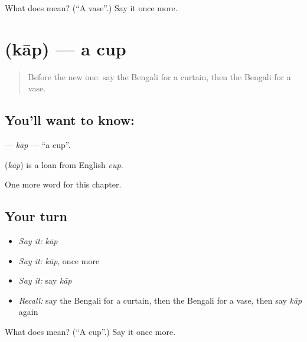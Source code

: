 \begin{tcolorbox}[breakable,colback=teal!4,colframe=teal!35!black,title={Before you move on}]
What does  mean? (\textquotedblleft{}A vase\textquotedblright{}.) Say it once more.
\end{tcolorbox}
\section[\texorpdfstring{\bn{কাপ} (kāp)}{কাপ (kāp)}]{ (kāp) — a cup}

\label{lesson:BN-C133-kap}



\begin{quote}
Before the new one: say the Bengali for a curtain, then the Bengali for a vase.
\end{quote}

\subsection*{You'll want to know: }
\textbf{} — \emph{kāp} — \textquotedblleft{}a cup\textquotedblright{}.

\begin{cousinweb}
\textbf{} (\emph{kāp}) is a loan from English \emph{cup}.
\end{cousinweb}

\begin{grammarlens}[title={What you've built}]
One more word for this chapter.
\end{grammarlens}

\subsection*{Your turn}
\begin{itemize}
\raggedright
  \item \emph{Say it:} \emph{kāp}
  \item \emph{Say it:} \emph{kāp}, once more
  \item \emph{Say it:} say \emph{kāp}
  \item \emph{Recall:} say the Bengali for a curtain, then the Bengali for a vase, then say \emph{kāp} again
\end{itemize}

\begin{tcolorbox}[breakable,colback=teal!4,colframe=teal!35!black,title={Before you move on}]
What does  mean? (\textquotedblleft{}A cup\textquotedblright{}.) Say it once more.
\end{tcolorbox}
